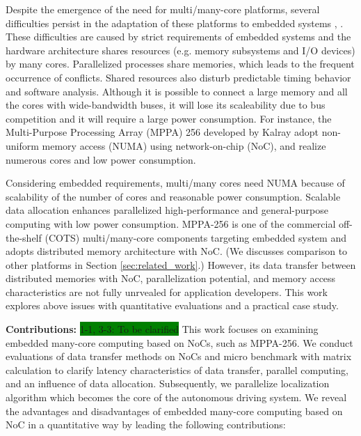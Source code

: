 \documentclass[conference,compsoc]{IEEEtran}
\begin{document}
Despite the emergence of the need for multi/many-core platforms, several difficulties persist in the adaptation of these platforms to embedded systems \cite{becker2016contention}, \cite{saidi2015shift}.
These difficulties are caused by strict requirements of embedded systems and the hardware architecture shares resources (e.g. memory subsystems and I/O devices) by many cores.
Parallelized processes share memories, which leads to the frequent occurrence of conflicts.
Shared resources also disturb predictable timing behavior and software analysis.
Although it is possible to connect a large memory and all the cores with wide-bandwidth buses, it will lose its scaleability due to bus competition and it will require a large power consumption.
For instance, the Multi-Purpose Processing Array (MPPA) 256 developed by Kalray \cite{de2014time} adopt non-uniform memory access (NUMA) using network-on-chip (NoC), and realize numerous cores and low power consumption.

Considering embedded requirements, multi/many cores need NUMA because of scalability of the number of cores and reasonable power consumption.
Scalable data allocation enhances parallelized high-performance and general-purpose computing with low power consumption.
MPPA-256 is one of the commercial off-the-shelf (COTS) multi/many-core components targeting embedded system and adopts distributed memory architecture with NoC. (We discusses comparison to other platforms in Section \ref{sec:related_work}.)
However, its data transfer between distributed memories with NoC, parallelization potential, and memory access characteristics are not fully unrvealed for application developers.
This work explores above issues with quantitative evaluations and a practical case study.

\textbf{Contributions:}
\colorbox{green}{1-1, 3-3: To be clarified}
This work focuses on examining embedded many-core computing based on NoCs, such as MPPA-256.
We conduct evaluations of data transfer methods on NoCs and micro benchmark with matrix calculation to clarify latency characteristics of data transfer, parallel computing, and an influence of data allocation.
Subsequently, we parallelize localization algorithm which becomes the core of the autonomous driving system.
We reveal the advantages and disadvantages of embedded many-core computing based on NoC in a quantitative way by leading the following contributions:
\end{document}
